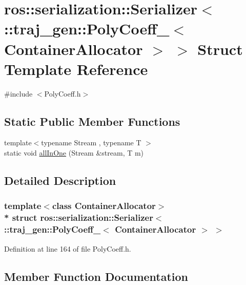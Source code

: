 \hypertarget{structros_1_1serialization_1_1_serializer_3_01_1_1traj__gen_1_1_poly_coeff___3_01_container_allocator_01_4_01_4}{}\section{ros\+:\+:serialization\+:\+:Serializer$<$ \+:\+:traj\+\_\+gen\+:\+:Poly\+Coeff\+\_\+$<$ Container\+Allocator $>$ $>$ Struct Template Reference}
\label{structros_1_1serialization_1_1_serializer_3_01_1_1traj__gen_1_1_poly_coeff___3_01_container_allocator_01_4_01_4}


{\ttfamily \#include $<$Poly\+Coeff.\+h$>$}

\subsection*{Static Public Member Functions}
\begin{DoxyCompactItemize}
\item 
{\footnotesize template$<$typename Stream , typename T $>$ }\\static void \hyperlink{structros_1_1serialization_1_1_serializer_3_01_1_1traj__gen_1_1_poly_coeff___3_01_container_allocator_01_4_01_4_a9604883ed8af9754cf427c88305773c6}{all\+In\+One} (Stream \&stream, T m)
\end{DoxyCompactItemize}


\subsection{Detailed Description}
\subsubsection*{template$<$class Container\+Allocator$>$\\*
struct ros\+::serialization\+::\+Serializer$<$ \+::traj\+\_\+gen\+::\+Poly\+Coeff\+\_\+$<$ Container\+Allocator $>$ $>$}



Definition at line 164 of file Poly\+Coeff.\+h.



\subsection{Member Function Documentation}
